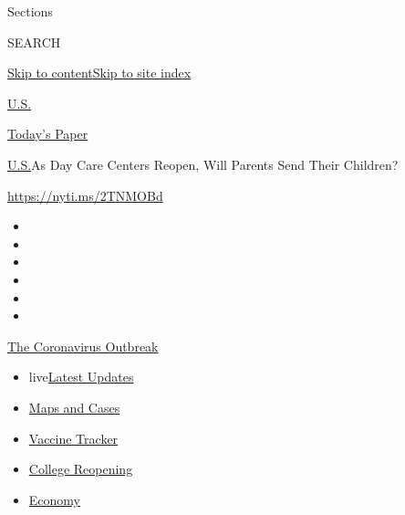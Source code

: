 Sections

SEARCH

\protect\hyperlink{site-content}{Skip to
content}\protect\hyperlink{site-index}{Skip to site index}

\href{https://www.nytimes.com/section/us}{U.S.}

\href{https://myaccount.nytimes.com/auth/login?response_type=cookie\&client_id=vi}{}

\href{https://www.nytimes.com/section/todayspaper}{Today's Paper}

\href{/section/us}{U.S.}\textbar{}As Day Care Centers Reopen, Will
Parents Send Their Children?

\url{https://nyti.ms/2TNMOBd}

\begin{itemize}
\item
\item
\item
\item
\item
\item
\end{itemize}

\href{https://www.nytimes.com/news-event/coronavirus?action=click\&pgtype=Article\&state=default\&region=TOP_BANNER\&context=storylines_menu}{The
Coronavirus Outbreak}

\begin{itemize}
\tightlist
\item
  live\href{https://www.nytimes.com/2020/08/04/world/coronavirus-cases.html?action=click\&pgtype=Article\&state=default\&region=TOP_BANNER\&context=storylines_menu}{Latest
  Updates}
\item
  \href{https://www.nytimes.com/interactive/2020/us/coronavirus-us-cases.html?action=click\&pgtype=Article\&state=default\&region=TOP_BANNER\&context=storylines_menu}{Maps
  and Cases}
\item
  \href{https://www.nytimes.com/interactive/2020/science/coronavirus-vaccine-tracker.html?action=click\&pgtype=Article\&state=default\&region=TOP_BANNER\&context=storylines_menu}{Vaccine
  Tracker}
\item
  \href{https://www.nytimes.com/2020/08/02/us/covid-college-reopening.html?action=click\&pgtype=Article\&state=default\&region=TOP_BANNER\&context=storylines_menu}{College
  Reopening}
\item
  \href{https://www.nytimes.com/live/2020/08/04/business/stock-market-today-coronavirus?action=click\&pgtype=Article\&state=default\&region=TOP_BANNER\&context=storylines_menu}{Economy}
\end{itemize}

